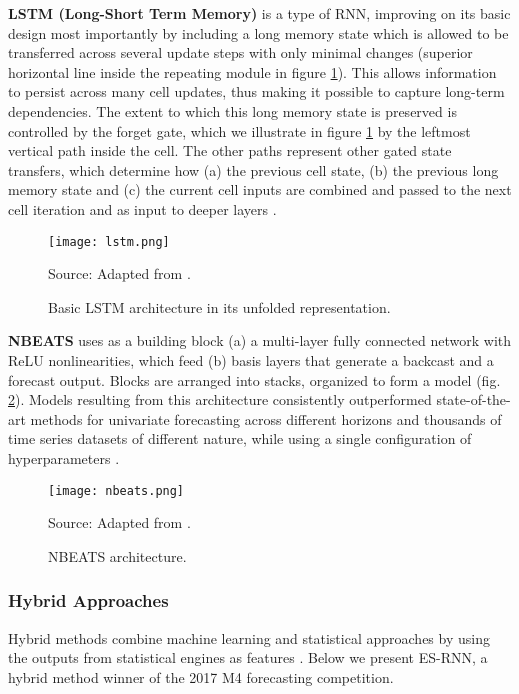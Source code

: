 \noindent
\textbf{LSTM (Long-Short Term Memory)} is a type of RNN, improving on its basic design most importantly by including a long memory state which is allowed to be transferred across several update steps with only minimal changes (superior horizontal line inside the repeating module in figure \ref{fig:lstm}).
This allows information to persist across many cell updates, thus making it possible to capture long-term dependencies.
The extent to which this long memory state is preserved is controlled by the forget gate, which we illustrate in figure \ref{fig:lstm} by the leftmost vertical path inside the cell.
The other paths represent other gated state transfers, which determine how (a) the previous cell state, (b) the previous long memory state and (c) the current cell inputs are combined and passed to the next cell iteration and as input to deeper layers \cite{paneru2015lstm}.
\begin{figure}[H]
   \centering
    \caption{Basic LSTM architecture in its unfolded representation. }
    \texttt{[image: lstm.png]}  \\
    \raggedright
    Source: Adapted from \cite{paneru2015lstm}.
   \label{fig:lstm}
\end{figure}

\noindent
\textbf{NBEATS} uses as a building block (a) a multi-layer fully connected network with ReLU nonlinearities, which feed (b) basis layers that generate a backcast and a forecast output.
Blocks are arranged into stacks, organized to form a model (fig. \ref{fig:nbeats}).
Models resulting from this architecture consistently outperformed state-of-the-art methods for univariate forecasting across different horizons and thousands of time series datasets of different nature, while using a single configuration of hyperparameters \cite{oreshkin2019nbeats}.
\begin{figure}[H]
   \centering
    \caption{NBEATS architecture.}
    \texttt{[image: nbeats.png]}  \\
    \raggedright
    Source: Adapted from \cite{oreshkin2019nbeats}.
   \label{fig:nbeats}
\end{figure}

\subsubsection{Hybrid Approaches}
Hybrid methods combine machine learning and statistical approaches by using the outputs from statistical engines as features \cite{oreshkin2019nbeats}. Below we present ES-RNN, a hybrid method winner of the 2017 M4 forecasting competition.

